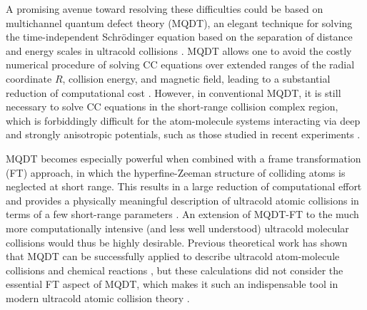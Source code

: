 \documentclass[reprint,amssymb,noeprint,twocolumn,longbibliography]{revtex4-2}
\begin{document}
A promising avenue toward resolving these difficulties could be based on multichannel quantum defect theory (MQDT), an elegant technique for solving the time-independent Schr\"{o}dinger equation based on the separation of distance and energy scales in ultracold collisions \cite{Greene_82,Mies_84,Gao_96,Gao:09,Gao:11,Mies_00,Raoult_04,Croft_11,Croft_12,Croft_13,Jisha_14,Jisha_14b}.
MQDT allows one to avoid the costly numerical procedure of solving CC equations over extended ranges of the radial coordinate $R$, collision energy, and magnetic field, leading to a substantial reduction of computational cost \cite{Croft_11,Croft_12, Croft_13,Jisha_14,Jisha_14b,Burke_98,Burke_99,Gao_05}.
However, in conventional MQDT, it is still necessary to solve CC equations in the short-range collision complex region, which is forbiddingly difficult for the atom-molecule systems interacting via deep and strongly anisotropic potentials, such as those studied in recent experiments \cite{Yang_19,Wang_21,Son_22,Park:23b,Nichols_22}.


MQDT becomes especially powerful when combined with a frame transformation (FT) approach, in which the hyperfine-Zeeman structure of colliding atoms is neglected at short range.  This results in a large reduction of computational effort and provides a physically meaningful description of ultracold atomic collisions in terms of a few short-range parameters \cite{Burke_98,Burke_99,Gao_05, Hanna_09,Idziaszek_2011,Perez-Rios_15,Li_15}. An extension of MQDT-FT to the much more computationally intensive (and less well understood) ultracold molecular collisions would thus be highly desirable. Previous theoretical work has shown that  MQDT can be successfully applied to describe ultracold atom-molecule collisions \cite{Croft_11,Croft_12,Croft_13,Jisha_14} and chemical reactions \cite{Jisha_14b}, but these calculations did not consider the essential FT aspect of MQDT, which makes it such an indispensable tool in modern ultracold atomic collision theory  \cite{Burke_98,Burke_99,Gao_05, Hanna_09,Idziaszek_2011,Perez-Rios_15,Li_15}.
\end{document}
